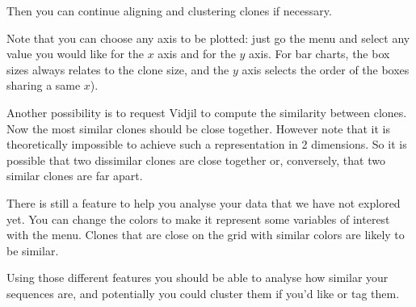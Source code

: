 \documentclass[11pt]{article}
\begin{document}
Then you can continue aligning and clustering clones if necessary.


Note that you can choose any axis to be plotted: just go the  menu and
select any value you would like for the $x$ axis and for the $y$ axis.
For bar charts, the box sizes always relates to the clone size,
and the $y$ axis selects the order of the boxes sharing a same $x$).



Another possibility is to request Vidjil to compute the similarity between
clones.
Now the most similar clones should be close together. However note that it is
theoretically impossible to achieve such a representation in 2 dimensions. So
it is possible that two dissimilar clones are close together or, conversely,
that two similar clones are far apart.


There is still a feature to help you analyse your data that we have not
explored yet.
You can change the colors to make it represent some variables of interest
with the  menu.
Clones that are close on the grid with similar colors are likely to
be similar.

  
Using those different features you should be able to analyse how similar your
sequences are, and potentially you could cluster them if you'd like or tag them.
\end{document}
